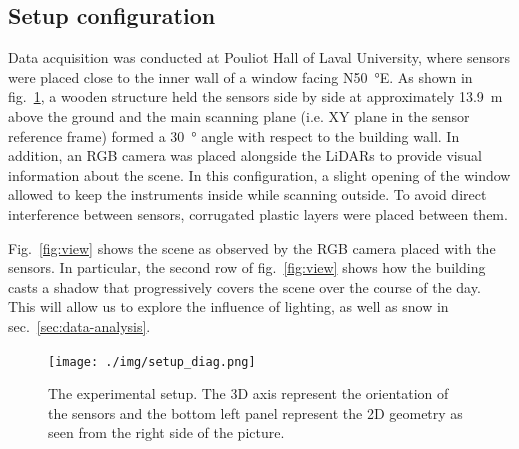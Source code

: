 \subsection{Setup configuration}

Data acquisition was conducted at Pouliot Hall of Laval University, where sensors were placed close to the inner wall of a window facing N\SI{50}{\degree}E. As shown in fig.~\ref{fig:setup}, a wooden structure held the sensors side by side at approximately \SI{13.9}{\meter} above the ground and the main scanning plane (i.e. XY plane in the sensor reference frame) formed a \SI{30}{\degree} angle with respect to the building wall. In addition, an RGB camera was placed alongside the LiDARs to provide visual information about the scene. In this configuration, a slight opening of the window allowed to keep the instruments inside while scanning outside. To avoid direct interference between sensors, corrugated plastic layers were placed between them. 

Fig.~\ref{fig:view} shows the scene as observed by the RGB camera placed with the sensors. In particular, the second row of fig.~\ref{fig:view} shows how the building casts a shadow that progressively covers the scene over the course of the day. This will allow us to explore the influence of lighting, as well as snow in sec.~\ref{sec:data-analysis}. 

\begin{figure}[th]
    \centering
    \texttt{[image: ./img/setup\_diag.png]}
    \caption{The experimental setup. The 3D axis represent the orientation of the sensors and the bottom left panel represent the 2D geometry as seen from the right side of the picture. }
    \label{fig:setup}
\end{figure}

